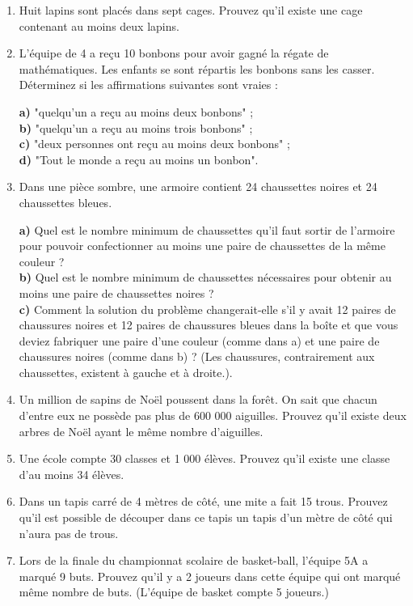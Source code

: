 \documentclass{article}
\begin{document}
\begin{enumerate}
    \item Huit lapins sont placés dans sept cages. Prouvez qu'il existe une cage contenant au moins deux lapins.
    
    \item L'équipe de 4 a reçu 10 bonbons pour avoir gagné la régate de mathématiques. Les enfants se sont répartis les bonbons sans les casser. Déterminez si les affirmations suivantes sont vraies :
    \par
    \textbf{a)} "quelqu'un a reçu au moins deux bonbons" ;\\
    \textbf{b)} "quelqu'un a reçu au moins trois bonbons" ;\\
    \textbf{c)} "deux personnes ont reçu au moins deux bonbons" ;\\
    \textbf{d)} "Tout le monde a reçu au moins un bonbon".

    \item Dans une pièce sombre, une armoire contient 24 chaussettes noires et 24 chaussettes bleues.
    \par
    \textbf{a)} Quel est le nombre minimum de chaussettes qu'il faut sortir de l'armoire pour pouvoir confectionner au moins une paire de chaussettes de la même couleur ? \\
    \textbf{b)} Quel est le nombre minimum de chaussettes nécessaires pour obtenir au moins une paire de chaussettes noires ? \\
    \textbf{c)} Comment la solution du problème changerait-elle s'il y avait 12 paires de chaussures noires et 12 paires de chaussures bleues dans la boîte et que vous deviez fabriquer une paire d'une couleur (comme dans a) et une paire de chaussures noires (comme dans b) ? (Les chaussures, contrairement aux chaussettes, existent à gauche et à droite.).

    \item Un million de sapins de Noël poussent dans la forêt. On sait que chacun d'entre eux ne possède pas plus de 600 000 aiguilles. Prouvez qu'il existe deux arbres de Noël ayant le même nombre d'aiguilles.

    \item Une école compte 30 classes et 1 000 élèves. Prouvez qu'il existe une classe d'au moins 34 élèves.

    \item Dans un tapis carré de 4 mètres de côté, une mite a fait 15 trous. Prouvez qu'il est possible de découper dans ce tapis un tapis d'un mètre de côté qui n'aura pas de trous.

    \item Lors de la finale du championnat scolaire de basket-ball, l'équipe 5A a marqué 9 buts. Prouvez qu'il y a 2 joueurs dans cette équipe qui ont marqué même nombre de buts. (L'équipe de basket compte 5 joueurs.)
    
\end{enumerate}
\end{document}
